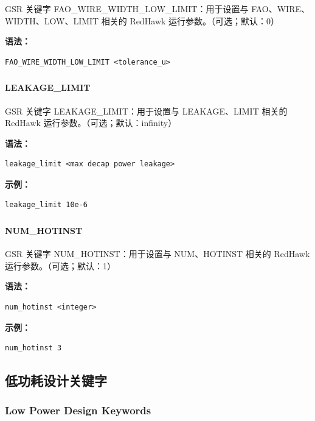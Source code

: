 GSR 关键字 FAO_WIRE_WIDTH_LOW_LIMIT：用于设置与 FAO、WIRE、WIDTH、LOW、LIMIT 相关的 RedHawk 运行参数。（可选；默认：0）

\textbf{语法：}
\begin{lstlisting}
FAO_WIRE_WIDTH_LOW_LIMIT <tolerance_u>
\end{lstlisting}

\subsubsection{}
\paragraph*{LEAKAGE_LIMIT}

GSR 关键字 LEAKAGE_LIMIT：用于设置与 LEAKAGE、LIMIT 相关的 RedHawk 运行参数。（可选；默认：infinity）

\textbf{语法：}
\begin{lstlisting}
leakage_limit <max decap power leakage>
\end{lstlisting}

\textbf{示例：}
\begin{lstlisting}
leakage_limit 10e-6
\end{lstlisting}

\subsubsection{}
\paragraph*{NUM_HOTINST}

GSR 关键字 NUM_HOTINST：用于设置与 NUM、HOTINST 相关的 RedHawk 运行参数。（可选；默认：1）

\textbf{语法：}
\begin{lstlisting}
num_hotinst <integer>
\end{lstlisting}

\textbf{示例：}
\begin{lstlisting}
num_hotinst 3
\end{lstlisting}

\subsection{低功耗设计关键字}
\subsubsection*{Low Power Design Keywords}

